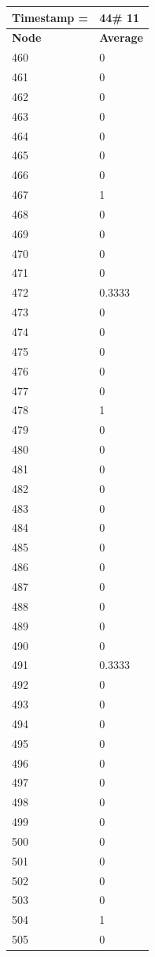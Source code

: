 \begin{tabular}{|l||l|}
\hline
\textbf{Timestamp =} & \textbf{44}\# 11\\\hline
	\textbf{Node} & \textbf{Average} \\ \hline
\hline
	460 & 0 \\ \hline
	461 & 0 \\ \hline
	462 & 0 \\ \hline
	463 & 0 \\ \hline
	464 & 0 \\ \hline
	465 & 0 \\ \hline
	466 & 0 \\ \hline
	467 & 1 \\ \hline
	468 & 0 \\ \hline
	469 & 0 \\ \hline
	470 & 0 \\ \hline
	471 & 0 \\ \hline
	472 & 0.3333 \\ \hline
	473 & 0 \\ \hline
	474 & 0 \\ \hline
	475 & 0 \\ \hline
	476 & 0 \\ \hline
	477 & 0 \\ \hline
	478 & 1 \\ \hline
	479 & 0 \\ \hline
	480 & 0 \\ \hline
	481 & 0 \\ \hline
	482 & 0 \\ \hline
	483 & 0 \\ \hline
	484 & 0 \\ \hline
	485 & 0 \\ \hline
	486 & 0 \\ \hline
	487 & 0 \\ \hline
	488 & 0 \\ \hline
	489 & 0 \\ \hline
	490 & 0 \\ \hline
	491 & 0.3333 \\ \hline
	492 & 0 \\ \hline
	493 & 0 \\ \hline
	494 & 0 \\ \hline
	495 & 0 \\ \hline
	496 & 0 \\ \hline
	497 & 0 \\ \hline
	498 & 0 \\ \hline
	499 & 0 \\ \hline
	500 & 0 \\ \hline
	501 & 0 \\ \hline
	502 & 0 \\ \hline
	503 & 0 \\ \hline
	504 & 1 \\ \hline
	505 & 0 \\ \hline
\end{tabular}
